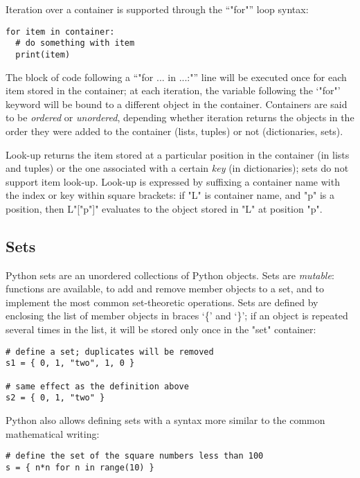 {Iteration over a container is supported through the ``"for"'' loop
syntax:
\begin{lstlisting}
for item in container:
  # do something with item
  print(item)
\end{lstlisting}
The block of code following a ``"for ... in ...:"'' line will be
executed once for each item stored in the container; at each
iteration, the variable following the `"for"' keyword will be bound to
a different object in the container.  Containers are said to be
\emph{ordered} or \emph{unordered}, depending whether iteration
returns the objects in the order they were added to the container
(lists, tuples) or not (dictionaries, sets).

Look-up returns the item stored at a particular position in the
container (in lists and tuples) or the one associated with a certain
\emph{key} (in dictionaries); sets do not support item look-up.  
Look-up is expressed by suffixing a container name with the index or key
within square brackets: if "L" is container name, and "p" is a
position, then L"["p"]" evaluates to the object stored in "L" at
position "p".

\subsection{Sets}
\label{sec:sets}

Python sets are an unordered collections of Python objects.  Sets are
\emph{mutable}: functions are available, to add and remove member objects to
a set, and to implement the most common set-theoretic operations.
Sets are defined by enclosing the list of member objects in braces
`\{' and `\}'; if an object is repeated several times in the list,
it will be stored only once in the "set" container:
\begin{lstlisting}
# define a set; duplicates will be removed
s1 = { 0, 1, "two", 1, 0 }

# same effect as the definition above
s2 = { 0, 1, "two" }
\end{lstlisting}
Python also allows defining sets with a syntax more similar to the
common mathematical writing:
\begin{lstlisting}
# define the set of the square numbers less than 100
s = { n*n for n in range(10) }


\end{lstlisting}}

